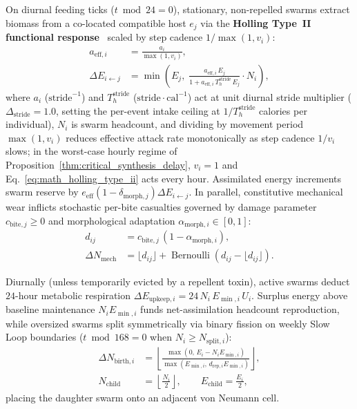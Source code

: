 On diurnal feeding ticks ($t \bmod 24 = 0$), stationary, non-repelled swarms extract biomass from a co-located compatible host $e_j$ via the \textbf{Holling Type~II functional response}~\cite{holling1959components} scaled by step cadence $1/\max(1, v_i)$:
\begin{align}
  a_{\text{eff}, i} &= \frac{a_i}{\max(1, v_i)}, \nonumber \\
  \Delta E_{i \leftarrow j} &= \min\!\left(E_j,\; \frac{a_{\text{eff}, i}\, E_j}{1 + a_{\text{eff}, i}\, T_h^{\text{stride}}\, E_j} \cdot N_i\right),
  \label{eq:math_holling_type_ii}
\end{align}
where $a_i$ ($\mathrm{stride}^{-1}$) and $T_h^{\text{stride}}$ ($\mathrm{stride}\cdot\mathrm{cal}^{-1}$) act at unit diurnal stride multiplier ($\Delta_{\text{stride}} = 1.0$, setting the per-event intake ceiling at $1/T_h^{\text{stride}}$ calories per individual), $N_i$ is swarm headcount, and dividing by movement period $\max(1, v_i)$ reduces effective attack rate monotonically as step cadence $1/v_i$ slows; in the worst-case hourly regime of Proposition~\ref{thm:critical_synthesis_delay}, $v_i = 1$ and Eq.~\eqref{eq:math_holling_type_ii} acts every hour. Assimilated energy increments swarm reserve by $e_{\text{eff}}(1 - \delta_{\mathrm{morph}, j})\Delta E_{i \leftarrow j}$. In parallel, constitutive mechanical wear inflicts stochastic per-bite casualties governed by damage parameter $c_{\mathrm{bite},j} \ge 0$ and morphological adaptation $\alpha_{\mathrm{morph},i} \in [0, 1]$:
\begin{align}
  d_{ij} &= c_{\mathrm{bite},j}\,(1 - \alpha_{\mathrm{morph},i}), \nonumber \\
  \Delta N_{\text{mech}} &= \lfloor d_{ij} \rfloor + \operatorname{Bernoulli}\!\left(d_{ij} - \lfloor d_{ij} \rfloor\right).
  \label{eq:mechanical_wear}
\end{align}

Diurnally (unless temporarily evicted by a repellent toxin), active swarms deduct $24$-hour metabolic respiration $\Delta E_{\text{upkeep}, i} = 24\,N_i\,E_{\min, i}\,U_i$. Surplus energy above baseline maintenance $N_i E_{\min, i}$ funds net-assimilation headcount reproduction, while oversized swarms split symmetrically via binary fission on weekly Slow Loop boundaries ($t \bmod 168 = 0$ when $N_i \ge N_{\text{split}, i}$):
\begin{align}
  \Delta N_{\text{birth}, i} &= \left\lfloor \frac{\max\!\left(0,\, E_i - N_i E_{\min, i}\right)}{\max\!\left(E_{\min, i},\, d_{\text{rep}, i} E_{\min, i}\right)} \right\rfloor, \nonumber \\
  N_{\text{child}} &= \left\lfloor \frac{N_i}{2} \right\rfloor, \qquad E_{\text{child}} = \frac{E_i}{2},
  \label{eq:swarm_repro_mitosis}
\end{align}
placing the daughter swarm onto an adjacent von Neumann cell.

